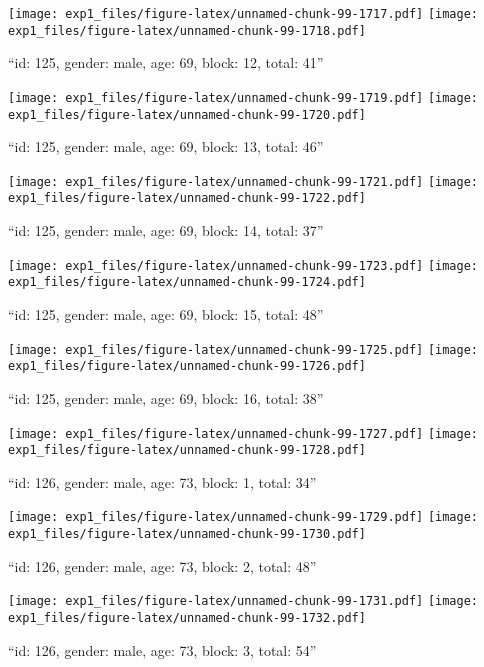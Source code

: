 \documentclass[,]{article}
\begin{document}
\texttt{[image: exp1\_files/figure-latex/unnamed-chunk-99-1717.pdf]}
\texttt{[image: exp1\_files/figure-latex/unnamed-chunk-99-1718.pdf]}

\newpage
[1] 

``id: 125, gender: male, age: 69, block: 12, total: 41''

\texttt{[image: exp1\_files/figure-latex/unnamed-chunk-99-1719.pdf]}
\texttt{[image: exp1\_files/figure-latex/unnamed-chunk-99-1720.pdf]}

\newpage
[1] 

``id: 125, gender: male, age: 69, block: 13, total: 46''

\texttt{[image: exp1\_files/figure-latex/unnamed-chunk-99-1721.pdf]}
\texttt{[image: exp1\_files/figure-latex/unnamed-chunk-99-1722.pdf]}

\newpage
[1] 

``id: 125, gender: male, age: 69, block: 14, total: 37''

\texttt{[image: exp1\_files/figure-latex/unnamed-chunk-99-1723.pdf]}
\texttt{[image: exp1\_files/figure-latex/unnamed-chunk-99-1724.pdf]}

\newpage
[1] 

``id: 125, gender: male, age: 69, block: 15, total: 48''

\texttt{[image: exp1\_files/figure-latex/unnamed-chunk-99-1725.pdf]}
\texttt{[image: exp1\_files/figure-latex/unnamed-chunk-99-1726.pdf]}

\newpage
[1] 

``id: 125, gender: male, age: 69, block: 16, total: 38''

\texttt{[image: exp1\_files/figure-latex/unnamed-chunk-99-1727.pdf]}
\texttt{[image: exp1\_files/figure-latex/unnamed-chunk-99-1728.pdf]}

\newpage
[1] 

``id: 126, gender: male, age: 73, block: 1, total: 34''

\texttt{[image: exp1\_files/figure-latex/unnamed-chunk-99-1729.pdf]}
\texttt{[image: exp1\_files/figure-latex/unnamed-chunk-99-1730.pdf]}

\newpage
[1] 

``id: 126, gender: male, age: 73, block: 2, total: 48''

\texttt{[image: exp1\_files/figure-latex/unnamed-chunk-99-1731.pdf]}
\texttt{[image: exp1\_files/figure-latex/unnamed-chunk-99-1732.pdf]}

\newpage
[1] 

``id: 126, gender: male, age: 73, block: 3, total: 54''
\end{document}
